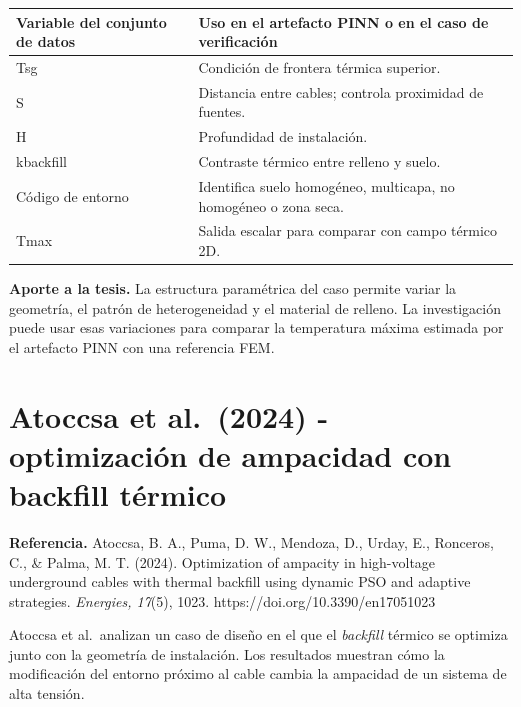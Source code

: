 \documentclass[11pt,a4paper,oneside]{report}
\newcounter{none}
\begin{document}
{\def\LTcaptype{none} %
\begin{longtable}[]{@{}
  >{\raggedright\arraybackslash}p{}
  >{\raggedright\arraybackslash}p{}@{}}
\toprule\noalign{}
\begin{minipage}[b]{\linewidth}\raggedright
Variable del conjunto de datos
\end{minipage} & \begin{minipage}[b]{\linewidth}\raggedright
Uso en el artefacto PINN o en el caso de verificación
\end{minipage} \\
\midrule\noalign{}
\endhead
\bottomrule\noalign{}
\endlastfoot
Tsg & Condición de frontera térmica superior. \\
S & Distancia entre cables; controla proximidad de fuentes. \\
H & Profundidad de instalación. \\
kbackfill & Contraste térmico entre relleno y suelo. \\
Código de entorno & Identifica suelo homogéneo, multicapa, no homogéneo
o zona seca. \\
Tmax & Salida escalar para comparar con campo térmico 2D. \\
\end{longtable}
}

\textbf{Aporte a la tesis.} La estructura paramétrica del caso permite
variar la geometría, el patrón de heterogeneidad y el material de
relleno. La investigación puede usar esas variaciones para comparar la
temperatura máxima estimada por el artefacto PINN con una referencia
FEM.

\section{Atoccsa et al.~(2024) - optimización de ampacidad con backfill
térmico}\label{atoccsa-et-al.-2024---optimizaciuxf3n-de-ampacidad-con-backfill-tuxe9rmico}

\textbf{Referencia.} Atoccsa, B. A., Puma, D. W., Mendoza, D., Urday,
E., Ronceros, C., \& Palma, M. T. (2024). Optimization of ampacity in
high-voltage underground cables with thermal backfill using dynamic PSO
and adaptive strategies. \emph{Energies, 17}(5), 1023.
https://doi.org/10.3390/en17051023

Atoccsa et al.~analizan un caso de diseño en el que el \textit{backfill}
térmico se optimiza junto con la geometría de instalación. Los
resultados muestran cómo la modificación del entorno próximo al cable
cambia la ampacidad de un sistema de alta tensión.
\end{document}
